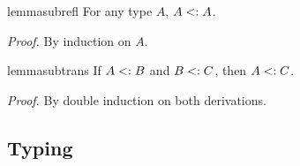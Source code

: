 \begin{restatable}{lemma}{subrefl}
  \label{lemma:subrefl}
  For any type $A$, $A <: A$.
\end{restatable}%
\noindent \emph{Proof.} By induction on $A$.
\begin{restatable}{lemma}{subtrans}
  \label{lemma:subtrans}
  If $A <: B$ and $B <: C$, then $A <: C$.
\end{restatable}%
\noindent \emph{Proof.} By double induction on both derivations.


%
%

\subsection{Typing}

\begin{comment}
\begin{figure}[!t]
  \begin{mathpar}
    \formwf \\ \rulewfint \and \rulewfvardis \and \rulewffun \and \rulewfrec \and 
    \rulewftop \and \rulewfforalldis \and \rulewfinterdis 
  \end{mathpar}

  \caption{Well-formedness rules for types of \name.}
  \label{fig:wf}
\end{figure}
\end{comment}


